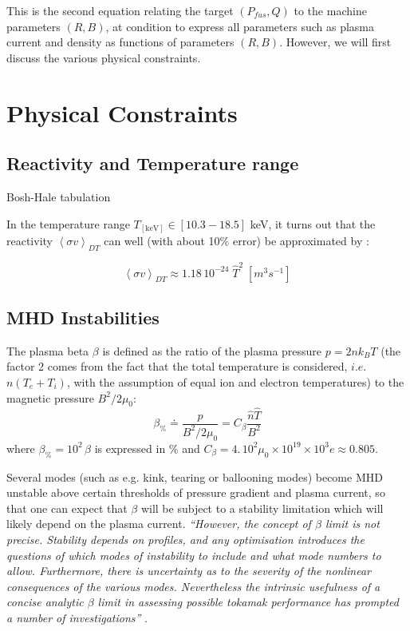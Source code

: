This is the second equation relating the target $(P_{fus}, Q)$ to the machine parameters $(R,B)$, at condition to express all parameters such as plasma current and density as functions of parameters $(R,B)$. However, we will first discuss the various physical constraints.

\section{Physical Constraints}
\subsection{Reactivity and Temperature range}
Bosh-Hale tabulation

In the temperature range $T_{\mathrm{[keV]}} \in [10.3-18.5]$ keV, it turns out that the reactivity $\left< \sigma v \right>_{DT}$ can well (with about 10$\%$ error) be approximated by \cite[(1.5.4)]{Wesson2004}: 

\begin{equation*}
\left< \sigma v \right>_{DT} \approx 1.18\, 10^{-24}\; \hat T^2 \;\si{\left[m^3 s^{-1}\right]}
\end{equation*}

\subsection{MHD Instabilities}
The plasma beta $\beta$ is defined as the ratio of the plasma pressure $p=2nk_BT$ (the factor 2 comes from the fact that the total temperature is considered, $i.e.$ $n(T_e+T_i)$, with the assumption of equal ion and electron temperatures) to the magnetic pressure $B^2/2\mu_0$:
\begin{equation}
\boxed{\beta_\% \doteq \frac{p}{B^2/2\mu_0}
	= C_\beta \frac{\hat n \hat T}{B^2}}
\label{eqn:beta}
\end{equation}
where $\beta_\%=10^2\, \beta$ is expressed in $\%$ and $C_\beta = 4.\,10^2\mu_0\times 10^{19}\times 10^3 e \approx 0.805$.

Several modes (such as e.g. kink, tearing or ballooning modes) become MHD unstable above certain thresholds of pressure gradient and plasma current, so that one can expect that $\beta$ will be subject to a stability limitation which will likely depend on the plasma current. \emph{``However, the concept of $\beta$ limit is not precise. Stability depends on profiles, and any optimisation introduces the questions of which modes of instability to include and what mode numbers to allow. Furthermore, there is uncertainty as to the severity of the nonlinear consequences of the various modes. Nevertheless the intrinsic usefulness of a concise analytic $\beta$ limit in assessing possible tokamak performance has prompted a number of investigations''} \cite{Wesson2004}.

